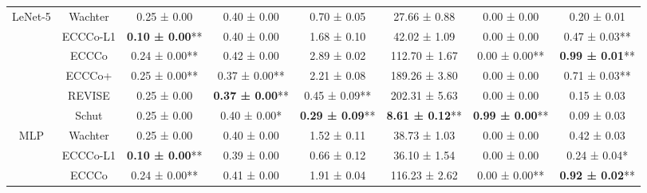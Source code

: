 \begin{table}
{\begin{tabular}[t]{cccccccc}
\multirow[t]{-6}{*}{\centering\arraybackslash LeNet-5} & Wachter & 0.25 ± 0.00\hphantom{*}\hphantom{*} & 0.40 ± 0.00\hphantom{*}\hphantom{*} & 0.70 ± 0.05\hphantom{*}\hphantom{*} & 27.66 ± 0.88\hphantom{*}\hphantom{*} & 0.00 ± 0.00\hphantom{*}\hphantom{*} & 0.20 ± 0.01\hphantom{*}\hphantom{*}\\
\cmidrule{1-8}
 & ECCCo-L1 & \textbf{0.10 ± 0.00}** & 0.40 ± 0.00\hphantom{*}\hphantom{*} & 1.68 ± 0.10\hphantom{*}\hphantom{*} & 42.02 ± 1.09\hphantom{*}\hphantom{*} & 0.00 ± 0.00\hphantom{*}\hphantom{*} & 0.47 ± 0.03**\\

 & ECCCo & 0.24 ± 0.00** & 0.42 ± 0.00\hphantom{*}\hphantom{*} & 2.89 ± 0.02\hphantom{*}\hphantom{*} & 112.70 ± 1.67\hphantom{*}\hphantom{*} & 0.00 ± 0.00** & \textbf{0.99 ± 0.01}**\\

 & ECCCo+ & 0.25 ± 0.00** & 0.37 ± 0.00** & 2.21 ± 0.08\hphantom{*}\hphantom{*} & 189.26 ± 3.80\hphantom{*}\hphantom{*} & 0.00 ± 0.00\hphantom{*}\hphantom{*} & 0.71 ± 0.03**\\

 & REVISE & 0.25 ± 0.00\hphantom{*}\hphantom{*} & \textbf{0.37 ± 0.00}** & 0.45 ± 0.09** & 202.31 ± 5.63\hphantom{*}\hphantom{*} & 0.00 ± 0.00\hphantom{*}\hphantom{*} & 0.15 ± 0.03\hphantom{*}\hphantom{*}\\

 & Schut & 0.25 ± 0.00\hphantom{*}\hphantom{*} & 0.40 ± 0.00*\hphantom{*} & \textbf{0.29 ± 0.09}** & \textbf{8.61 ± 0.12}** & \textbf{0.99 ± 0.00}** & 0.09 ± 0.03\hphantom{*}\hphantom{*}\\

\multirow[t]{-6}{*}{\centering\arraybackslash MLP} & Wachter & 0.25 ± 0.00\hphantom{*}\hphantom{*} & 0.40 ± 0.00\hphantom{*}\hphantom{*} & 1.52 ± 0.11\hphantom{*}\hphantom{*} & 38.73 ± 1.03\hphantom{*}\hphantom{*} & 0.00 ± 0.00\hphantom{*}\hphantom{*} & 0.42 ± 0.03\hphantom{*}\hphantom{*}\\
\cmidrule{1-8}
 & ECCCo-L1 & \textbf{0.10 ± 0.00}** & 0.39 ± 0.00\hphantom{*}\hphantom{*} & 0.66 ± 0.12\hphantom{*}\hphantom{*} & 36.10 ± 1.54\hphantom{*}\hphantom{*} & 0.00 ± 0.00\hphantom{*}\hphantom{*} & 0.24 ± 0.04*\hphantom{*}\\

 & ECCCo & 0.24 ± 0.00** & 0.41 ± 0.00\hphantom{*}\hphantom{*} & 1.91 ± 0.04\hphantom{*}\hphantom{*} & 116.23 ± 2.62\hphantom{*}\hphantom{*} & 0.00 ± 0.00** & \textbf{0.92 ± 0.02}**\\


\end{tabular}}
\end{table}
